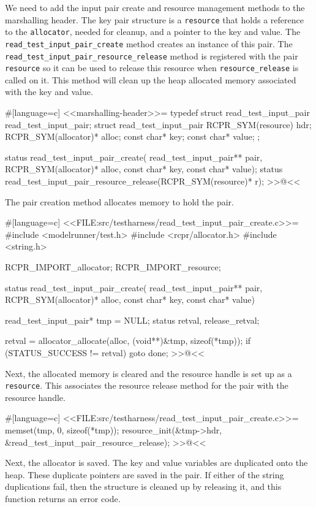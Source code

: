 {We need to add the input pair create and resource management methods to the
marshalling header. The key pair structure is a \verb/resource/ that holds a
reference to the \verb/allocator/, needed for cleanup, and a pointer to the key
and value. The \verb/read_test_input_pair_create/ method creates an instance of
this pair. The \verb/read_test_input_pair_resource_release/ method is registered
with the pair \verb/resource/ so it can be used to release this resource when
\verb/resource_release/ is called on it. This method will clean up the heap
allocated memory associated with the key and value.

#[language=c]
<<marshalling-header>>=
typedef struct read_test_input_pair read_test_input_pair;
struct read_test_input_pair
{
    RCPR_SYM(resource) hdr;
    RCPR_SYM(allocator)* alloc;
    const char* key;
    const char* value;
};

status read_test_input_pair_create(
    read_test_input_pair** pair, RCPR_SYM(allocator)* alloc, const char* key,
    const char* value);
status read_test_input_pair_resource_release(RCPR_SYM(resource)* r);
>>@<<

The pair creation method allocates memory to hold the pair.

#[language=c]
<<FILE:src/testharness/read_test_input_pair_create.c>>=
#include <modelrunner/test.h>
#include <rcpr/allocator.h>
#include <string.h>

RCPR_IMPORT_allocator;
RCPR_IMPORT_resource;

status read_test_input_pair_create(
    read_test_input_pair** pair, RCPR_SYM(allocator)* alloc, const char* key,
    const char* value)
{
    read_test_input_pair* tmp = NULL;
    status retval, release_retval;

    retval = allocator_allocate(alloc, (void**)&tmp, sizeof(*tmp));
    if (STATUS_SUCCESS != retval)
    {
        goto done;
    }
>>@<<

Next, the allocated memory is cleared and the resource handle is set up as a
\verb/resource/.  This associates the resource release method for the pair with
the resource handle.

#[language=c]
<<FILE:src/testharness/read_test_input_pair_create.c>>=
    memset(tmp, 0, sizeof(*tmp));
    resource_init(&tmp->hdr, &read_test_input_pair_resource_release);
>>@<<

Next, the allocator is saved.  The key and value variables are duplicated onto
the heap. These duplicate pointers are saved in the pair. If either of the
string duplications fail, then the structure is cleaned up by releasing it, and
this function returns an error code.

}}
